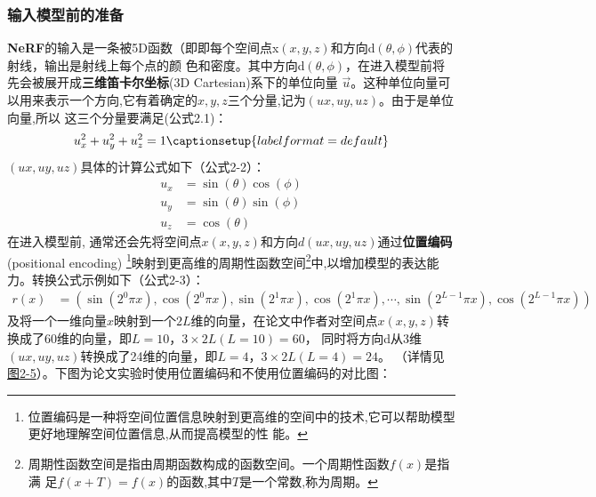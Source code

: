 \documentclass{nwputhesis}
\begin{document}
\subsubsection{输入模型前的准备}
\textbf{NeRF}的输入是一条被5D函数（即即每个空间点x$(x,y,z)$和方向d$(\theta,\phi)$代表的射线，输出是射线上每个点的颜
色和密度。其中方向d$(\theta,\phi)$，在进入模型前将先会被展开成\textbf{三维笛卡尔坐标}(3D Cartesian)系下的单位向量
\(\vec{u}\)。这种单位向量可以用来表示一个方向,它有着确定的$x,y,z$三个分量,记为$(ux, uy, uz)$。由于是单位向量,所以
这三个分量要满足(公式2.1)：
\begin{equation}
    \begin{aligned}
        u_x^2 + u_y^2 + u_z^2 = 1
        \captionsetup{labelformat=default}
    \end{aligned}
\end{equation}
$(ux, uy, uz)$具体的计算公式如下（公式2-2）：
\begin{equation}
    \begin{aligned}
        u_x &= \sin(\theta)\cos(\phi)\\
        u_y &= \sin(\theta)\sin(\phi)\\
        u_z &= \cos(\theta)
    \end{aligned}
\end{equation}
\indent
在进入模型前, 通常还会先将空间点$x(x,y,z)$和方向$d(ux, uy, uz)$通过\textbf{位置编码}(positional encoding)
\footnote{位置编码是一种将空间位置信息映射到更高维的空间中的技术,它可以帮助模型更好地理解空间位置信息,从而提高模型的性
能。}映射到更高维的周期性函数空间\footnote{周期性函数空间是指由周期函数构成的函数空间。一个周期性函数$f(x)$是指满
足$f(x+T) = f(x)$的函数,其中$T$是一个常数,称为周期。}中,以增加模型的表达能力。转换公式示例如下（公式2-3）：
\begin{equation}
    \begin{aligned}
        r(x) &= (\sin(2^0\pi x), \cos(2^0\pi x), \sin(2^1\pi x), \cos(2^1\pi x), \cdots, \sin(2^{L-1}\pi x), \cos(2^{L-1}\pi x))
    \end{aligned}
\end{equation}
\indent
及将一个一维向量$x$映射到一个$2L$维的向量，在论文中作者对空间点$x(x,y,z)$转换成了60维的向量，即$L=10$，$3 \times 2L(L=10) = 60$，
同时将方向d从3维$(ux, uy, uz)$转换成了24维的向量，即$L=4$，$3 \times 2L(L=4) = 24$。
（详情见\hyperlink{图2-5}{图2-5}）。下图为论文实验时使用位置编码和不使用位置编码的对比图：
\end{document}
